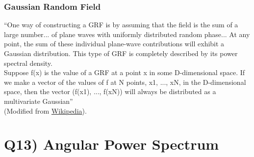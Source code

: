 \documentclass[\main/main.tex]{subfiles}
\begin{document}
	\subsubsection{Gaussian Random Field} %
	\label{ssub:gaussian_random_field}

		\begin{displayquote}
			``One way of constructing a GRF is by assuming that the field is the sum of a large number... of plane waves with uniformly distributed random phase... At any point, the sum of these individual plane-wave contributions will exhibit a Gaussian distribution. This type of GRF is completely described by its power spectral density.\\
			Suppose f(x) is the value of a GRF at a point x in some D-dimensional space. If we make a vector of the values of f at N points, x1, ..., xN, in the D-dimensional space, then the vector (f(x1), ..., f(xN)) will always be distributed as a multivariate Gaussian''\\
			(Modified from \href{https://en.wikipedia.org/wiki/Gaussian_random_field}{Wikipedia}).
		\end{displayquote}

	

	
	





\section{Q13) Angular Power Spectrum} %
\label{sec:q13_angular_power_spectrum}
\end{document}
